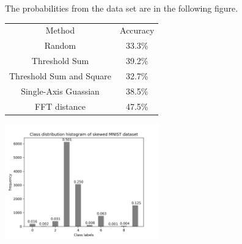 
The probabilities from the data set are in the following figure.


\begin{center}
    \begin{tabular}{ |c|c| } 
     \hline
     Method & Accuracy \\ 
     Random & 33.3\% \\ 
     Threshold Sum & 39.2\% \\ 
     Threshold Sum and Square & 32.7\% \\
     Single-Axis Guassian & 38.5\% \\
     FFT distance & 47.5\% \\
     \hline
     
    \end{tabular}
\end{center}



\begin{center}    
\includegraphics[width=0.5\textwidth]{class_histogram.png}
\end{center}  



